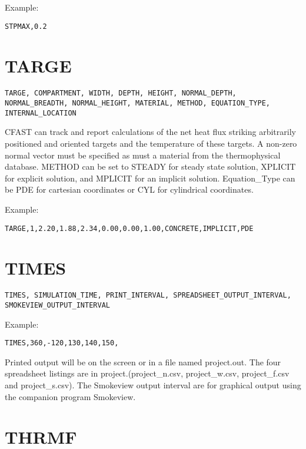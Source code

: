 Example:

\begin{lstlisting}
STPMAX,0.2
\end{lstlisting}

\section{TARGE}

\begin{lstlisting}
TARGE, COMPARTMENT, WIDTH, DEPTH, HEIGHT, NORMAL_DEPTH, NORMAL_BREADTH, NORMAL_HEIGHT, MATERIAL, METHOD, EQUATION_TYPE, INTERNAL_LOCATION
\end{lstlisting}

CFAST can track and report calculations of the net heat flux striking arbitrarily positioned and oriented targets and the temperature of these targets. A non-zero normal vector must be specified as must a material from the thermophysical database. METHOD can be set to STEADY for steady state solution, XPLICIT for explicit solution, and MPLICIT for an implicit solution. Equation\_Type can be PDE for cartesian coordinates or CYL for cylindrical coordinates.

Example:

\begin{lstlisting}
TARGE,1,2.20,1.88,2.34,0.00,0.00,1.00,CONCRETE,IMPLICIT,PDE
\end{lstlisting}

\section{TIMES}

\begin{lstlisting}
TIMES, SIMULATION_TIME, PRINT_INTERVAL, SPREADSHEET_OUTPUT_INTERVAL, SMOKEVIEW_OUTPUT_INTERVAL
\end{lstlisting}

Example:

\begin{lstlisting}
TIMES,360,-120,130,140,150,
\end{lstlisting}

Printed output will be on the screen or in a file named project.out. The four spreadsheet listings are in project.(project\_n.csv, project\_w.csv, project\_f.csv and project\_s.csv). The Smokeview output interval are for graphical output using the companion program Smokeview.

\section{THRMF}

